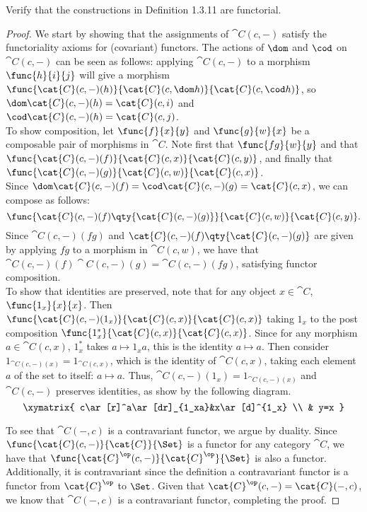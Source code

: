 \documentclass[main.tex]{subfiles}
\begin{document}
\begin{exercise}
	Verify that the constructions in Definition 1.3.11 are functorial.
\end{exercise}

\begin{proof}
	We start by showing that the assignments of $\cat{C}(c,-)$ satisfy the
	functoriality axioms for (covariant) functors. The actions of $\dom$ and
	$\cod$ on $\cat{C}(c,-)$ can be seen as follows: applying $\cat{C}(c,-)$ to
	a morphism $\func{h}{i}{j}$ will give a morphism
	$\func{\cat{C}(c,-)(h)}{\cat{C}(c,\dom h)}{ \cat{C}(c,\cod h)}$, so
	$\dom\cat{C}(c,-)(h) = \cat{C}(c,i)$ and $\cod\cat{C}(c,-)(h) =
	\cat{C}(c,j)$. \\

	To show composition, let $\func{f}{x}{y}$ and $\func{g}{w}{x}$ be a
	composable pair of morphisms in $\cat{C}$. Note first that $\func{f
	g}{w}{y}$ and that $\func{\cat{C}(c,-)(f)}{\cat{C}(c,x)}{\cat{C}(c,y)}$, and
	finally that $\func{\cat{C}(c,-)(g)}{\cat{C}(c,w)}{\cat{C}(c,x)}$. \\ Since
	$\dom\cat{C}(c,-)(f) = \cod\cat{C}(c,-)(g) = \cat{C}(c,x)$, we can compose
	as follows: \[\func{\cat{C}(c,-)(f)
	\qty{\cat{C}(c,-)(g)}}{\cat{C}(c,w)}{\cat{C}(c,y)}.\] Since
	$\cat{C}(c,-)(f g)$ 
	and $ \cat{C}(c,-)(f)\qty{\cat{C}(c,-)(g)} $ 
	are given by applying $f g$ to a morphism in
	$\cat{C}(c,w)$, we have that $\cat{C}(c,-)(f) \cat{C}(c,-)(g) =
	\cat{C}(c,-)(f g)$, satisfying functor composition.\\

	To show that identities are preserved, note that for any object
	$x\in\cat{C}$, $\func{1_x}{x}{x}$. Then
	$\func{\cat{C}(c,-)(1_x)}{\cat{C}(c,x)}{\cat{C}(c,x)}$ taking $1_x$ to the
	post composition $\func{1^{*}_{x}}{\cat{C}(c,x)}{\cat{C}(c,x)}$. Since for
	any morphism $a\in\cat{C}(c,x)$, $1^{*}_x$ takes $a\mapsto 1_xa$, this is
	the identity $a\mapsto a$. Then consider $1_{\cat{C}(c,-)(x)} =
	1_{\cat{C}(c,x)}$, which is the identity of $\cat{C}(c,x)$, taking each
	element $a$ of the set to itself: $a\mapsto a$. Thus, $\cat{C}(c,-)(1_x) =
	1_{\cat{C}(c,-)(x)}$ and $\cat{C}(c,-)$ preserves identities, as show by the following diagram.\\
	\[\xymatrix{
		c\ar[r]^a\ar[dr]_{1_xa}&x\ar[d]^{1_x} \\
		& y=x
	}
	\]

	To see that $\cat{C}(-,c)$ is a contravariant functor, we argue by duality.
	Since $\func{\cat{C}(c,-)}{\cat{C}}{\Set}$ is a functor for any category
	$\cat{C}$, we have that $\func{\cat{C}^\op(c,-)}{\cat{C}^\op}{\Set}$ is also
	a functor. Additionally, it is contravariant since the definition a
	contravariant functor is a functor from $\cat{C}^\op$ to $\Set$. Given that
	$\cat{C}^\op(c,-) = \cat{C}(-,c)$, we know that $\cat{C}(-,c)$ is a
	contravariant functor, completing the proof.
\end{proof}
\end{document}

